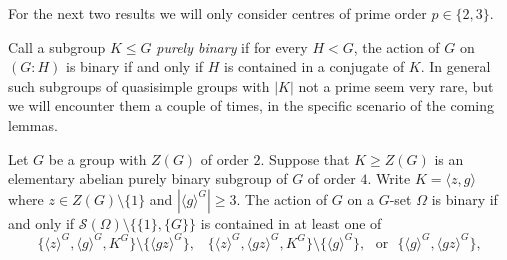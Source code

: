 \documentclass[11pt, a4paper]{amsart}
\begin{document}
For the next two results we will only consider centres of prime order $p\in\{2,3\}$.


      Call a subgroup $K\leq G$ \emph{purely binary} if for every $H<G$, the action of $G$ on $(G:H)$ is binary if and only if $H$ is contained in a conjugate of $K$. In general such subgroups of quasisimple groups with $|K|$ not a prime seem very rare, but we will encounter them a couple of times, in the specific scenario of the coming lemmas.

\begin{lemma}\label{lem:p^2intrans2}
    Let $G$ be a group with $Z(G)$ of order $2$. Suppose that $K\geq Z(G)$ is an elementary abelian purely binary subgroup of $G$ of order $4$. Write $K=\langle z,g\rangle$ where $z\in Z(G)\setminus\{1\}$ and $|\langle g\rangle^G|\geq 3$. The action of $G$ on a $G$-set $\Omega$ is binary if and only if $\mathcal{S}(\Omega)\setminus\{\{1\},\{G\}\}$ is contained in at least one of
      $$\{\langle z\rangle^G,\langle g\rangle^G,K^G\}\setminus\{\langle gz\rangle^G\},\,\,\,\,\,\{\langle z\rangle^G,\langle gz\rangle^G,K^G\}\setminus\{\langle g\rangle^G\},\,\,\text{ or }\,\, \{\langle g\rangle^G, \langle gz\rangle^G\},$$    \end{lemma}
\end{document}
